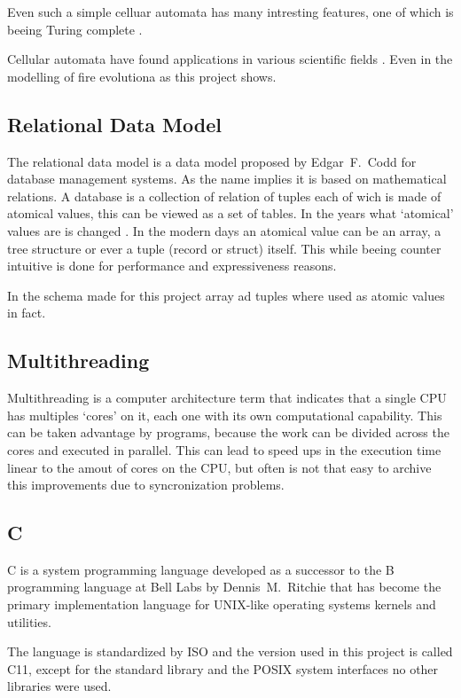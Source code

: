 \documentclass[Lau]{sapthesis} %
\begin{document}
Even such a simple celluar automata has many intresting features, one of which
is beeing Turing complete \cite{win}.

Cellular automata have found applications in various scientific fields
\cite{cellularbio}. Even in the modelling of fire evolutiona as this project
shows.

\subsection{Relational Data Model}

The relational data model is a data model proposed by Edgar~F.~Codd for database
management systems. As the name implies it is based on mathematical relations. A
database is a collection of relation of tuples each of wich is made of atomical
values, this can be viewed as a set of tables. In the years what `atomical'
values are is changed \cite{ordb}. In the modern days an atomical value can be
an array, a tree structure or ever a tuple (record or struct) itself. This while
beeing counter intuitive is done for performance and expressiveness reasons.

In the schema made for this project array ad tuples where used as atomic values
in fact.

\subsection{Multithreading}

Multithreading is a computer architecture term that indicates that a single CPU
has multiples `cores' on it, each one with its own computational capability.
This can be taken advantage by programs, because the work can be divided across
the cores and executed in parallel. This can lead to speed ups in the execution
time linear to the amout of cores on the CPU, but often is not that easy to
archive this improvements due to syncronization problems.

\subsection{C}

C is a system programming language developed as a successor to the B programming
language at Bell Labs by Dennis~M.~Ritchie that has become the primary
implementation language for UNIX-like operating systems kernels and utilities.

The language is standardized by ISO and the version used in this project is
called C11, except for the standard library and the POSIX system interfaces no
other libraries were used.
\end{document}
